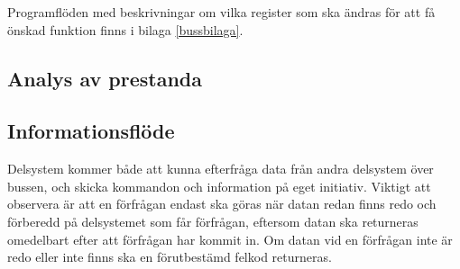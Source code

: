 Programflöden med beskrivningar om vilka register som ska ändras för att få önskad funktion finns i bilaga \ref{bussbilaga}.

\subsection{Analys av prestanda}

\subsection{Informationsflöde}

Delsystem kommer både att kunna efterfråga data från andra delsystem över bussen, och skicka kommandon och information på eget initiativ. Viktigt att observera är att en förfrågan endast ska göras när datan redan finns redo och förberedd på delsystemet som får förfrågan, eftersom datan ska returneras omedelbart efter att förfrågan har kommit in. Om datan vid en förfrågan inte är redo eller inte finns ska en förutbestämd felkod returneras.



